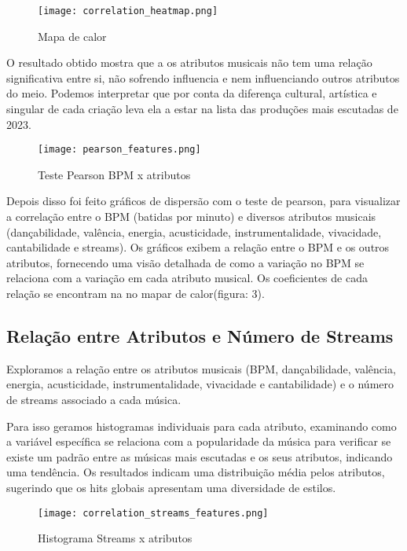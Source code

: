 \documentclass[12pt]{article}
\begin{document}
\begin{figure}[ht]
\centering
\texttt{[image: correlation\_heatmap.png]}
\caption{Mapa de calor}
\label{fig:exampleFig3}
\end{figure}


O resultado obtido mostra que a os atributos musicais não tem uma relação significativa entre si, não sofrendo influencia e nem influenciando outros atributos do meio. Podemos interpretar que por conta da diferença cultural, artística e singular de cada criação leva ela a estar na lista das produções mais escutadas de 2023.

\begin{figure}[ht]
\centering
\texttt{[image: pearson\_features.png]}
\caption{Teste Pearson BPM x atributos}
\label{fig:exampleFig4}
\end{figure}

Depois disso foi feito  gráficos de dispersão com o teste de pearson, para visualizar a correlação entre o BPM (batidas por minuto) e diversos atributos musicais (dançabilidade, valência, energia, acusticidade, instrumentalidade, vivacidade, cantabilidade e streams). Os gráficos exibem a relação entre o BPM e os outros atributos, fornecendo uma visão detalhada de como a variação no BPM se relaciona com a variação em cada atributo musical. Os coeficientes de cada relação se encontram na no mapar de calor(figura: 3).


\subsection{Relação entre Atributos e Número de Streams}

Exploramos a relação entre os atributos musicais (BPM, dançabilidade, valência, energia, acusticidade, instrumentalidade, vivacidade e cantabilidade) e o número de streams associado a cada música. 

Para isso geramos histogramas individuais para cada atributo, examinando como a variável específica se relaciona com a popularidade da música para verificar se existe um padrão entre as músicas mais escutadas e os seus atributos, indicando uma tendência. Os resultados indicam uma distribuição média pelos atributos, sugerindo que os hits globais apresentam uma diversidade de estilos.

\begin{figure}[ht]
\centering
\texttt{[image: correlation\_streams\_features.png]}
\caption{Histograma Streams x atributos}
\label{fig:exampleFig5}
\end{figure}
\end{document}
